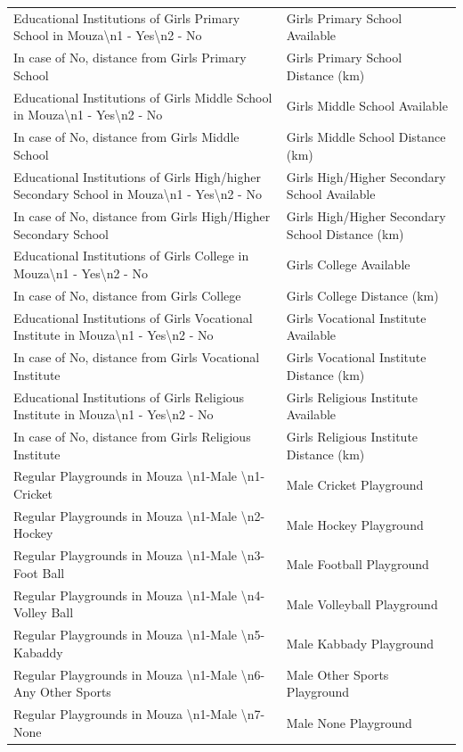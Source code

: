 \documentclass[10pt,a4paper]{article}
\begin{document}
\begin{longtable}{>{\raggedright\arraybackslash}p{7.5cm} >{\raggedright\arraybackslash}p{7.5cm}}
Educational Institutions of Girls Primary School in Mouza\textbackslash n1 - Yes\textbackslash n2 - No & Girls Primary School Available \\
In case of No, distance from Girls Primary School & Girls Primary School Distance (km) \\
Educational Institutions of Girls Middle School in Mouza\textbackslash n1 - Yes\textbackslash n2 - No & Girls Middle School Available \\
In case of No, distance from Girls Middle School & Girls Middle School Distance (km) \\
Educational Institutions of Girls High/higher Secondary School in Mouza\textbackslash n1 - Yes\textbackslash n2 - No & Girls High/Higher Secondary School Available \\
In case of No, distance from Girls High/Higher Secondary School & Girls High/Higher Secondary School Distance (km) \\
Educational Institutions of Girls College in Mouza\textbackslash n1 - Yes\textbackslash n2 - No & Girls College Available \\
In case of No, distance from Girls College & Girls College Distance (km) \\
Educational Institutions of Girls Vocational Institute in Mouza\textbackslash n1 - Yes\textbackslash n2 - No & Girls Vocational Institute Available \\
In case of No, distance from Girls Vocational Institute & Girls Vocational Institute Distance (km) \\
Educational Institutions of Girls Religious Institute in Mouza\textbackslash n1 - Yes\textbackslash n2 - No & Girls Religious Institute Available \\
In case of No, distance from Girls Religious Institute & Girls Religious Institute Distance (km) \\

Regular Playgrounds in Mouza \textbackslash n1-Male \textbackslash n1-Cricket & Male Cricket Playground \\
Regular Playgrounds in Mouza \textbackslash n1-Male \textbackslash n2-Hockey & Male Hockey Playground \\
Regular Playgrounds in Mouza \textbackslash n1-Male \textbackslash n3-Foot Ball & Male Football Playground \\
Regular Playgrounds in Mouza \textbackslash n1-Male \textbackslash n4-Volley Ball & Male Volleyball Playground \\
Regular Playgrounds in Mouza \textbackslash n1-Male \textbackslash n5-Kabaddy & Male Kabbady Playground \\
Regular Playgrounds in Mouza \textbackslash n1-Male \textbackslash n6-Any Other Sports & Male Other Sports Playground \\
Regular Playgrounds in Mouza \textbackslash n1-Male \textbackslash n7-None & Male None Playground \\


\end{longtable}
\end{document}
